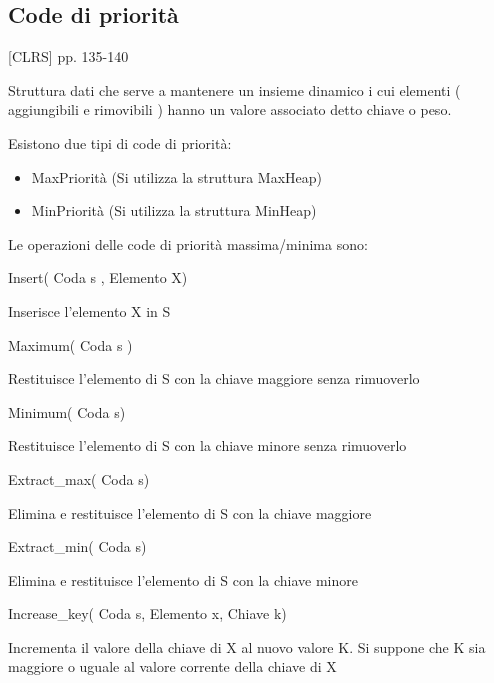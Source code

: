 \documentclass{article}
\providecommand{\tightlist}{%
  \setlength{\itemsep}{0pt}\setlength{\parskip}{0pt}}
\begin{document}
{}

\hypertarget{h.jih9riph7gns}{\subsection{\texorpdfstring{{Code di
priorità}}{Code di priorità}}\label{h.jih9riph7gns}}

{{[}CLRS{]} pp. 135-140}

{}

{Struttura dati che serve a mantenere un insieme dinamico i cui elementi
( aggiungibili e rimovibili ) hanno un valore associato detto }{chiave o
peso.}

{}

{Esistono due tipi di code di priorità:}

\begin{itemize}
\tightlist
\item
  {MaxPriorità (Si utilizza la struttura MaxHeap)}
\item
  {MinPriorità (Si utilizza la struttura MinHeap)}
\end{itemize}

{}

{Le operazioni delle code di priorità massima/minima sono:}

{}

{Insert( Coda s , Elemento X)}

{Inserisce l'elemento X in S}

{}

{Maximum( Coda s )}

{Restituisce l'elemento di S con la chiave maggiore senza rimuoverlo}

{}

{Minimum( Coda s) }

{Restituisce l'elemento di S con la chiave minore senza rimuoverlo}

{}

{Extract\_max( Coda s)}

{Elimina e restituisce l'elemento di S con la chiave maggiore}

{}

{Extract\_min( Coda s) }

{Elimina e restituisce l'elemento di S con la chiave minore}

{}

{Increase\_key( Coda s, Elemento x, Chiave k) }

{Incrementa il valore della chiave di X al nuovo valore K. Si suppone
che K sia maggiore o uguale al valore corrente della chiave di X}
\end{document}
